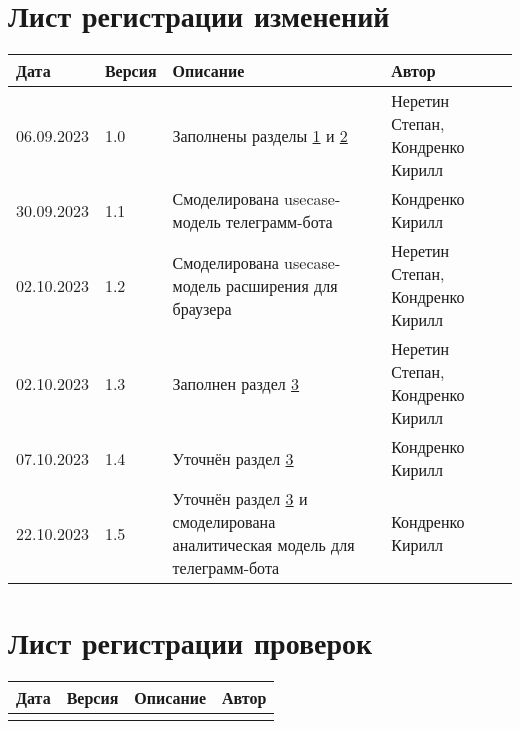\chapter*{Лист регистрации изменений}
	\begin{tabularx}{\textwidth}{
			| >{\centering\arraybackslash\hsize=2cm}X
			| >{\centering\arraybackslash\hsize=1.5cm}X
			| >{\centering\arraybackslash}X
			| >{\centering\arraybackslash\hsize=5cm}X
			|}
		\hline
		\textbf{Дата} & \textbf{Версия} & \textbf{Описание} & \textbf{Автор} \\\hline
		
		06.09.2023 & 1.0 & Заполнены разделы \hyperref[chapter1]{1} и \hyperref[chapter2]{2} & Неретин Степан, Кондренко Кирилл \\\hline
		
		30.09.2023 & 1.1 & Смоделирована usecase-модель телеграмм-бота & Кондренко Кирилл \\\hline
		
		02.10.2023 & 1.2 & Смоделирована usecase-модель расширения для браузера & Неретин Степан, Кондренко Кирилл \\\hline
		
		02.10.2023 & 1.3 & Заполнен раздел \hyperref[chapter3]{3} & Неретин Степан, Кондренко Кирилл \\\hline
		

		07.10.2023 & 1.4 & Уточнён раздел \hyperref[chapter3]{3} & Кондренко Кирилл \\\hline

		22.10.2023 & 1.5 & Уточнён раздел \hyperref[chapter3]{3} и смоделирована аналитическая модель для телеграмм-бота & Кондренко Кирилл \\\hline
	\end{tabularx}
\chapter*{Лист регистрации проверок}
	\begin{tabularx}{\textwidth}{
			| >{\centering\arraybackslash\hsize=2cm}X
			| >{\centering\arraybackslash\hsize=1.5cm}X
			| >{\centering\arraybackslash}X
			| >{\centering\arraybackslash\hsize=5cm}X
			|}
		\hline
		\textbf{Дата} & \textbf{Версия} & \textbf{Описание} & \textbf{Автор} \\
		\hline
		&&& \\
		\hline
	\end{tabularx}
